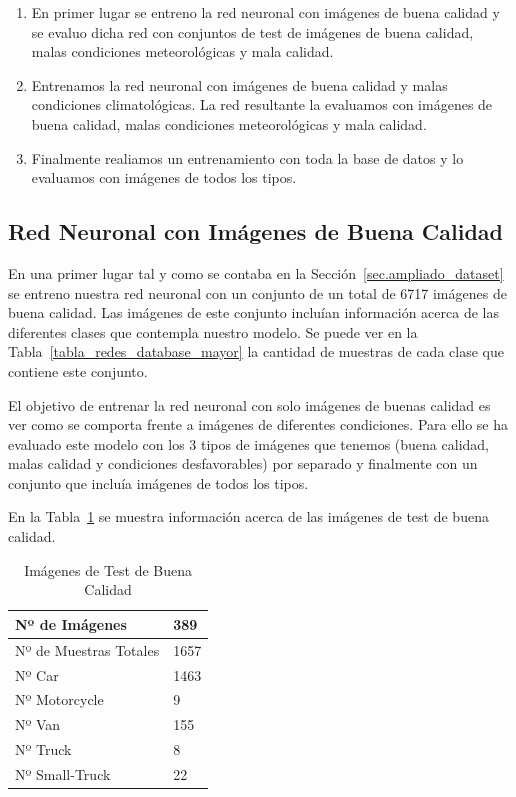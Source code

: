 \begin{enumerate}
    \item En primer lugar se entreno la red neuronal con imágenes de buena calidad y se evaluo dicha red con  conjuntos de test de imágenes de buena calidad, malas condiciones meteorológicas y mala calidad.
    \item Entrenamos la red neuronal con imágenes de buena calidad y malas condiciones climatológicas. La red resultante la evaluamos con imágenes de buena calidad, malas condiciones meteorológicas y mala calidad.
    \item Finalmente realiamos un entrenamiento con toda la base de datos y lo evaluamos con imágenes de todos los tipos.
\end{enumerate}

\subsection{Red Neuronal con Imágenes de Buena Calidad}

En una primer lugar tal y como se contaba en la Sección~\ref{sec.ampliado_dataset} se entreno nuestra red neuronal con un conjunto de un total de 6717 imágenes de buena calidad. Las imágenes de este conjunto incluían información acerca de las diferentes clases que contempla nuestro modelo. Se puede ver en la Tabla~\ref{tabla_redes_database_mayor} la cantidad de muestras de cada clase que contiene este conjunto.

El objetivo de entrenar la red neuronal con solo imágenes de buenas calidad es ver como se comporta frente a imágenes de diferentes condiciones. Para ello se ha evaluado este modelo con los 3 tipos de imágenes que tenemos (buena calidad, malas calidad y condiciones desfavorables) por separado y finalmente con un conjunto que incluía imágenes de todos los tipos.

En la Tabla~\ref{tab_img_test_buenas} se muestra información acerca de las imágenes de test de buena calidad.
\begin{table}[htbp][H] 
\begin{center}
\begin{tabular}{|l|l|}
\hline
Nº de Imágenes  & 389 \\
\hline \hline
Nº de Muestras Totales & 1657\\ \hline
Nº Car & 1463 \\ \hline
Nº Motorcycle & 9 \\ \hline
Nº Van & 155 \\ \hline
Nº Truck & 8 \\ \hline
Nº Small-Truck & 22 \\ \hline
\end{tabular}
\caption{Imágenes de Test de Buena Calidad}
\label{tab_img_test_buenas}
\end{center}
\end{table}

